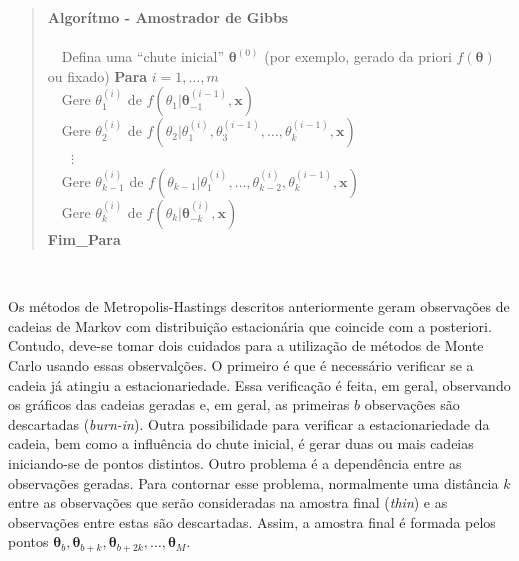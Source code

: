 \documentclass[
]{book}
\begin{document}
\begin{quote}
\textbf{Algorítmo - Amostrador de Gibbs}\\
\(~\)\\
\(~~~\) Defina uma ``chute inicial'' \(\boldsymbol \theta^{(0)}\) (por exemplo, gerado da priori \(f(\boldsymbol \theta)\) ou fixado)
\textbf{Para} \(i=1,...,m\)\\
\(~~~\) Gere \(\theta_1^{(i)}\) de \(f(\theta_1| \boldsymbol \theta_{-1}^{(i-1)},\boldsymbol x)\)\\
\(~~~\) Gere \(\theta_2^{(i)}\) de \(f(\theta_2| \theta_{1}^{(i)}, \theta_{3}^{(i-1)},\ldots, \theta_{k}^{(i-1)} ,\boldsymbol x)\)\\
\(~~~\) \(~~~\vdots\)\\
\(~~~\) Gere \(\theta_{k-1}^{(i)}\) de \(f(\theta_{k-1}| \theta_{1}^{(i)},\ldots, \theta_{k-2}^{(i)}, \theta_{k}^{(i-1)} ,\boldsymbol x)\)\\
\(~~~\) Gere \(\theta_k^{(i)}\) de \(f(\theta_k| \boldsymbol \theta_{-k}^{(i)} ,\boldsymbol x)\)\\
\textbf{Fim\_Para}
\end{quote}

\(~\)

Os métodos de Metropolis-Hastings descritos anteriormente geram observações de cadeias de Markov com distribuição estacionária que coincide com a posteriori. Contudo, deve-se tomar dois cuidados para a utilização de métodos de Monte Carlo usando essas observalções. O primeiro é que é necessário verificar se a cadeia já atingiu a estacionariedade. Essa verificação é feita, em geral, observando os gráficos das cadeias geradas e, em geral, as primeiras \(b\) observações são descartadas (\emph{burn-in}). Outra possibilidade para verificar a estacionariedade da cadeia, bem como a influência do chute inicial, é gerar duas ou mais cadeias iniciando-se de pontos distintos. Outro problema é a dependência entre as observações geradas. Para contornar esse problema, normalmente uma distância \(k\) entre as observações que serão consideradas na amostra final (\emph{thin}) e as observações entre estas são descartadas. Assim, a amostra final é formada pelos pontos \(\boldsymbol \theta_b, \boldsymbol \theta_{b+k}, \boldsymbol \theta_{b+2k},\ldots,\boldsymbol \theta_{M}\).

\(~\)
\end{document}
